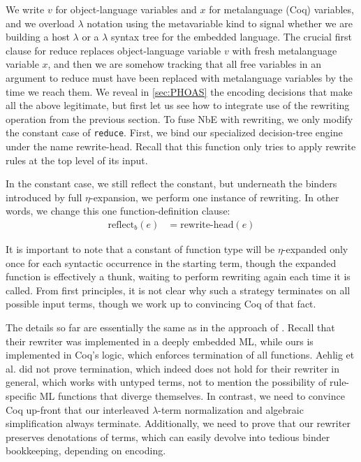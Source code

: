 \documentclass[sigplan,10pt,review,anonymous]{acmart}\settopmatter{printfolios=true,printccs=false,printacmref=false}
\newcommand{\defeq}{=}
\begin{document}
We write $v$ for object-language variables and $x$ for metalanguage (Coq) variables, and we overload $\lambda$ notation using the metavariable kind to signal whether we are building a host $\lambda$ or a $\lambda$ syntax tree for the embedded language.
The crucial first clause for reduce replaces object-language variable $v$ with fresh metalanguage variable $x$, and then we are somehow tracking that all free variables in an argument to reduce must have been replaced with metalanguage variables by the time we reach them.
We reveal in \autoref{sec:PHOAS} the encoding decisions that make all the above legitimate, but first let us see how to integrate use of the rewriting operation from the previous section.
To fuse NbE with rewriting, we only modify the constant case of \texttt{reduce}.
First, we bind our specialized decision-tree engine under the name rewrite-head.
Recall that this function only tries to apply rewrite rules at the top level of its input.

In the constant case, we still reflect the constant, but underneath the binders introduced by full $\eta$-expansion, we perform one instance of rewriting.
In other words, we change this one function-definition clause:
\begin{align*}
  \text{reflect}_{b}(e) & \defeq \text{rewrite-head}(e)
\end{align*}

It is important to note that a constant of function type will be $\eta$-expanded only once for each syntactic occurrence in the starting term, though the expanded function is effectively a thunk, waiting to perform rewriting again each time it is called.
From first principles, it is not clear why such a strategy terminates on all possible input terms, though we work up to convincing Coq of that fact.

The details so far are essentially the same as in the approach of \citet{Aehlig}.
Recall that their rewriter was implemented in a deeply embedded ML, while ours is implemented in Coq's logic, which enforces termination of all functions.
Aehlig et al. did not prove termination, which indeed does not hold for their rewriter in general, which works with untyped terms, not to mention the possibility of rule-specific ML functions that diverge themselves.
In contrast, we need to convince Coq up-front that our interleaved $\lambda$-term normalization and algebraic simplification always terminate.
Additionally, we need to prove that our rewriter preserves denotations of terms, which can easily devolve into tedious binder bookkeeping, depending on encoding.
\end{document}
